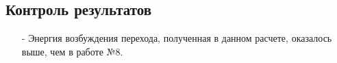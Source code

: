 \subsection{Контроль результатов}
\begin{itemize}
    \item[-] Энергия возбуждения перехода, полученная в данном расчете, оказалось выше, чем в работе №8.
\end{itemize}{}